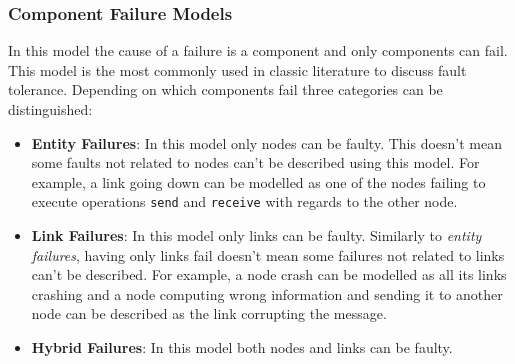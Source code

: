 \documentclass[..]{subfiles}
\begin{document}
\subsubsection{Component Failure Models}

In this model the cause of a failure is a component and only components can fail. This model is the most commonly used in classic literature to discuss fault tolerance. Depending on which components fail three categories can be distinguished:
\begin{itemize}
	\item \textbf{Entity Failures}: In this model only nodes can be faulty. This doesn't mean some faults not related to nodes can't be described using this model. For example, a link going down can be modelled as one of the nodes failing to execute operations \texttt{send} and \texttt{receive} with regards to the other node.
	\item \textbf{Link Failures}: In this model only links can be faulty. Similarly to \textit{entity failures}, having only links fail doesn't mean some failures not related to links can't be described. For example, a node crash can be modelled as all its links crashing and a node computing wrong information and sending it to another node can be described as the link corrupting the message.

	\item \textbf{Hybrid Failures}: In this model both nodes and links can be faulty.
\end{itemize}
\end{document}
